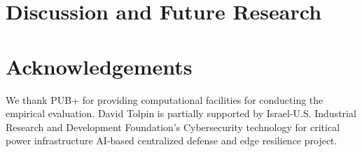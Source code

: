\documentclass[runningheads]{llncs}
\begin{document}
\section{Discussion and Future Research}

\section*{Acknowledgements}

We thank PUB+ for providing computational facilities for
conducting the empirical evaluation. David Tolpin is partially
supported by Israel-U.S. Industrial Research and Development
Foundation's Cybersecurity technology for critical power
infrastructure AI-based centralized defense and edge resilience
project.

\nocite{BDS21}
\nocite{CPK+18}
\nocite{SYG+19}
\nocite{KC18}
\nocite{LKW16}
\nocite{BRH15}
\nocite{AV20}
\nocite{FSK+16}
\nocite{MFS+21}
\nocite{FSP+16}
\nocite{SZN+19}
\nocite{LYY+19}
\nocite{CYP+21}
\nocite{YB21}
\nocite{CKD+15}
\nocite{HS97}
\nocite{CMB+14}
\nocite{WSY+21}



\end{document}
